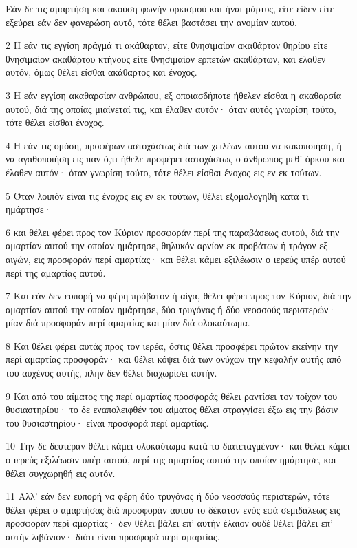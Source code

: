 \par Εάν δε τις αμαρτήση και ακούση φωνήν ορκισμού και ήναι μάρτυς, είτε είδεν είτε εξεύρει εάν δεν φανερώση αυτό, τότε θέλει βαστάσει την ανομίαν αυτού.
\par 2 Η εάν τις εγγίση πράγμά τι ακάθαρτον, είτε θνησιμαίον ακαθάρτον θηρίου είτε θνησιμαίον ακαθάρτου κτήνους είτε θνησιμαίον ερπετών ακαθάρτων, και έλαθεν αυτόν, όμως θέλει είσθαι ακάθαρτος και ένοχος.
\par 3 Η εάν εγγίση ακαθαρσίαν ανθρώπου, εξ οποιασδήποτε ήθελεν είσθαι η ακαθαρσία αυτού, διά της οποίας μιαίνεταί τις, και έλαθεν αυτόν· όταν αυτός γνωρίση τούτο, τότε θέλει είσθαι ένοχος.
\par 4 Η εάν τις ομόση, προφέρων αστοχάστως διά των χειλέων αυτού να κακοποιήση, ή να αγαθοποιήση εις παν ό,τι ήθελε προφέρει αστοχάστως ο άνθρωπος μεθ' όρκου και έλαθεν αυτόν· όταν γνωρίση τούτο, τότε θέλει είσθαι ένοχος εις εν εκ τούτων.
\par 5 Όταν λοιπόν είναι τις ένοχος εις εν εκ τούτων, θέλει εξομολογηθή κατά τι ημάρτησε·
\par 6 και θέλει φέρει προς τον Κύριον προσφοράν περί της παραβάσεως αυτού, διά την αμαρτίαν αυτού την οποίαν ημάρτησε, θηλυκόν αρνίον εκ προβάτων ή τράγον εξ αιγών, εις προσφοράν περί αμαρτίας· και θέλει κάμει εξιλέωσιν ο ιερεύς υπέρ αυτού περί της αμαρτίας αυτού.
\par 7 Και εάν δεν ευπορή να φέρη πρόβατον ή αίγα, θέλει φέρει προς τον Κύριον, διά την αμαρτίαν αυτού την οποίαν ημάρτησε, δύο τρυγόνας ή δύο νεοσσούς περιστερών· μίαν διά προσφοράν περί αμαρτίας και μίαν διά ολοκαύτωμα.
\par 8 Και θέλει φέρει αυτάς προς τον ιερέα, όστις θέλει προσφέρει πρώτον εκείνην την περί αμαρτίας προσφοράν· και θέλει κόψει διά των ονύχων την κεφαλήν αυτής από του αυχένος αυτής, πλην δεν θέλει διαχωρίσει αυτήν.
\par 9 Και από του αίματος της περί αμαρτίας προσφοράς θέλει ραντίσει τον τοίχον του θυσιαστηρίου· το δε εναπολειφθέν του αίματος θέλει στραγγίσει έξω εις την βάσιν του θυσιαστηρίου· είναι προσφορά περί αμαρτίας.
\par 10 Την δε δευτέραν θέλει κάμει ολοκαύτωμα κατά το διατεταγμένον· και θέλει κάμει ο ιερεύς εξιλέωσιν υπέρ αυτού, περί της αμαρτίας αυτού την οποίαν ημάρτησε, και θέλει συγχωρηθή εις αυτόν.
\par 11 Αλλ' εάν δεν ευπορή να φέρη δύο τρυγόνας ή δύο νεοσσούς περιστερών, τότε θέλει φέρει ο αμαρτήσας διά προσφοράν αυτού το δέκατον ενός εφά σεμιδάλεως εις προσφοράν περί αμαρτίας· δεν θέλει βάλει επ' αυτήν έλαιον ουδέ θέλει βάλει επ' αυτήν λιβάνιον· διότι είναι προσφορά περί αμαρτίας.
